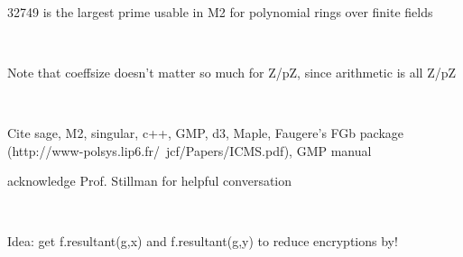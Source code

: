 \documentclass[11pt]{report}
\begin{document}
\

32749 is the largest prime usable in M2 for polynomial rings over finite fields

\

Note that coeffsize doesn't matter so much for Z/pZ, since arithmetic is all Z/pZ

\

Cite sage, M2, singular, c++, GMP, d3, Maple, Faugere's FGb package (http://www-polsys.lip6.fr/~jcf/Papers/ICMS.pdf), GMP manual

acknowledge Prof. Stillman for helpful conversation

\

Idea: get f.resultant(g,x) and f.resultant(g,y) to reduce encryptions by!
\end{document}
